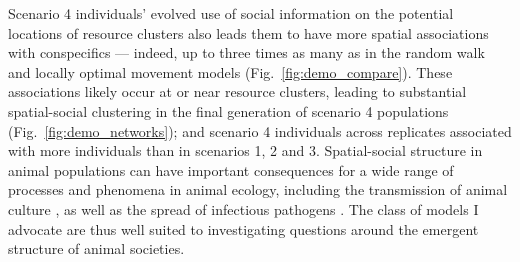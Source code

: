 \begin{interludeenv}
Scenario 4 individuals' evolved use of social information on the potential locations of resource clusters also leads them to have more spatial associations with conspecifics --- indeed, up to three times as many as in the random walk and locally optimal movement models (Fig.~\ref{fig:demo_compare}).
These associations likely occur at or near resource clusters, leading to substantial spatial-social clustering in the final generation of scenario 4 populations (Fig.~\ref{fig:demo_networks}); and scenario 4 individuals across replicates associated with more individuals than in scenarios 1, 2 and 3.
Spatial-social structure in animal populations can have important consequences for a wide range of processes and phenomena in animal ecology, including the transmission of animal culture \citep[such as foraging tactics or migration routes][]{romano2020,romano2021}, as well as the spread of infectious pathogens \citep{white2017,white2018}.
The class of models I advocate are thus well suited to investigating questions around the emergent structure of animal societies.


\end{interludeenv}
